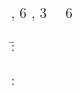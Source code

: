 \PreambleSectionTitle{\AbstractTitle}
%
\ThesisSchool
%
%
\begin{doublespace}

\ThesisAuthor

\textbf{\ThesisTitle}
\\
\ThesisSubject
\\
\CurrentYear
\\
\TotalNumberOfPages \TotalPagesWord, 6 \FiguresWord, 3 \TablesWord~\AndWord~6 \AppendicesWord
%
\begin{tabbing}
\ExaminersWord:\quad\= \ThesisFirstExaminer\\
\> \ThesisSupervisor
\end{tabbing}
%
\KeywordsWord: \ThesisKeywords
\end{doublespace}
%
